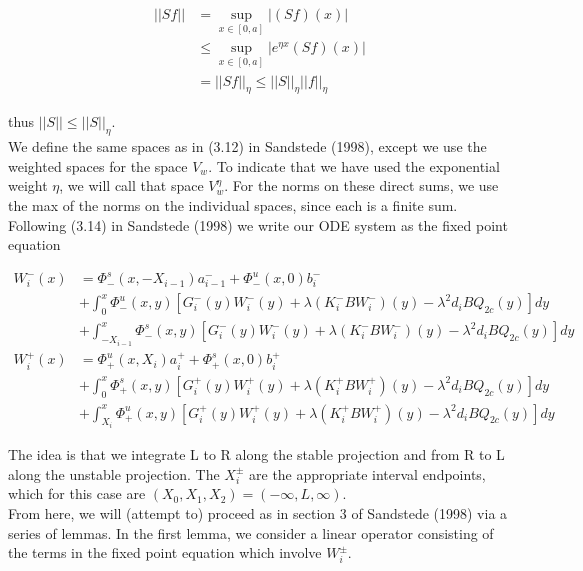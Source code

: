 \documentclass[12pt]{article}
\begin{document}
\begin{align*}
||S f|| &= \sup_{x \in [0,a]} | (S f)(x) | \\
& \leq \sup_{x \in [0,a]} | e^{\eta x} (S f)(x) | \\
&= || S f ||_\eta \leq ||S||_\eta ||f||_\eta
\end{align*}

thus $||S|| \leq ||S||_\eta$.\\
 
We define the same spaces as in (3.12) in Sandstede (1998), except we use the weighted spaces for the space $V_w$. To indicate that we have used the exponential weight $\eta$, we will call that space $V_w^\eta$. For the norms on these direct sums, we use the max of the norms on the individual spaces, since each is a finite sum.\\

Following (3.14) in Sandstede (1998) we write our ODE system as the fixed point equation

\begin{align*}
W_i^-(x) &= \Phi^s_-(x, -X_{i-1})a^-_{i-1} + \Phi^u_-(x, 0)b_i^- \\
&+ \int_0^x \Phi^u_-(x, y)[G_i^-(y) W_i^-(y) + \lambda (K_i^- B W_i^-)(y) - \lambda^2 d_i B Q_{2c}(y) ] dy \\
&+ \int_{-X_{i-1}}^x \Phi^s_-(x, y)[G_i^-(y) W_i^-(y) + \lambda (K_i^-B W_i^-)(y) - \lambda^2 d_i B Q_{2c}(y) ] dy \\
W_i^+(x) &= \Phi^u_+(x, X_i)a^+_{i} + \Phi^s_+(x, 0)b_i^+ \\
&+ \int_0^x \Phi^s_+(x, y)[G_i^+(y) W_i^+(y) + \lambda (K_i^+ B W_i^+)(y) - \lambda^2 d_i B Q_{2c}(y) ] dy \\
&+ \int_{X_{i}}^x \Phi^u_+(x, y)[G_i^+(y) W_i^+(y) + \lambda (K_i^+ B W_i^+)(y) - \lambda^2 d_i B Q_{2c}(y) ] dy
\end{align*}

The idea is that we integrate L to R along the stable projection and from R to L along the unstable projection. The $X_i^\pm$ are the appropriate interval endpoints, which for this case are $(X_0, X_1, X_2) = (-\infty, L, \infty)$.\\

From here, we will (attempt to) proceed as in section 3 of Sandstede (1998) via a series of lemmas. In the first lemma, we consider a linear operator consisting of the terms in the fixed point equation which involve $W_i^\pm$. 
\end{document}
